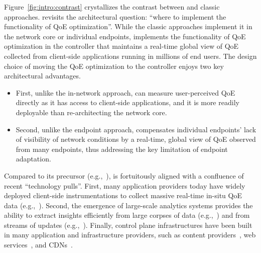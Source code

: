 Figure~\ref{fig:intro:contrast} crystallizes the contrast between
\ddn and classic approaches.
\ddn revisits the architectural question: ``where to implement the functionality of QoE 
optimization''.
While the classic approaches implement it in the network core or individual endpoints, 
\ddn implements the functionality of QoE optimization in the controller 
that maintains a real-time global view of QoE collected from
client-side applications running in millions of end users.
The design choice of moving the QoE optimization to the \ddn controller enjoys
two key architectural advantages.
\begin{itemize}
\item First, unlike the in-network approach, 
\ddn can measure user-perceived QoE directly as it has access to client-side applications,
and it is more readily deployable than 
re-architecting the network core.
\item Second, unlike the endpoint approach, 
\ddn compensates individual endpoints' lack of 
visibility of network conditions by a real-time, global view of QoE 
observed from many endpoints, thus addressing the key limitation of 
endpoint adaptation. 
\end{itemize}

 Compared to its precursor (e.g.,~\cite{spand,seshan1997spand}),
\ddn is fortuitously aligned with a confluence of recent  ``technology pulls''. 
First, many application providers today have widely deployed client-side 
instrumentations to collect massive real-time in-situ QoE data  (e.g.,~\cite{sigcomm11,via,imc12akamai,artizanetworks}). 
Second, the emergence of large-scale analytics systems provides the ability 
to extract insights efficiently from large corpses 
of data (e.g.,~\cite{spark}) and from streams of updates 
(e.g.,~\cite{zaharia2013discretized}). 
Finally, control plane infrastructures have been built in many 
application and infrastructure providers, such as 
content providers~\cite{c3}, web services~\cite{footprint},
and CDNs~\cite{chen2015end,mukerjee2015practical}.

